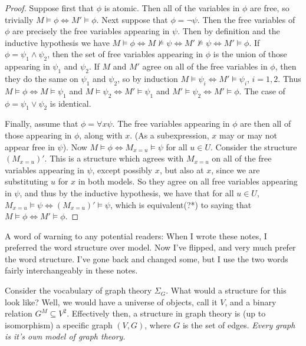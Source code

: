 \begin{proof}
    Suppose first that $\phi$ is atomic. Then all of the variables in $\phi$ are free, so trivially $M \models \phi \iff M' \models \phi$. Next suppose that $\phi = \neg \psi$. Then the free variables of $\phi$ are precisely the free variables appearing in $\psi$. Then by definition and the inductive hypothesis we have $M \models \phi \iff M \nvDash \psi \iff M' \nvDash \psi \iff M' \models \phi$. If $\phi = \psi_1 \wedge \psi_2$, then the set of free variables appearing in $\phi$ is the union of those appearing in $\psi_1$ and $\psi_2$. If $M$ and $M'$ agree on all of the free variables in $\phi$, then they do the same on $\psi_1$ and $\psi_2$, so by induction $M \models \psi_i \iff M' \models \psi_i$, $i=1,2$. Thus $M \models \phi \iff M \models \psi_1$ and $M \models \psi_2 \iff M' \models \psi_1$ and $M' \models \psi_2 \iff M' \models \phi$. The case of $\phi = \psi_1 \vee \psi_2$ is identical.
    \par Finally, assume that $\phi = \forall x \psi$. The free variables appearing in $\phi$ are then all of those appearing in $\phi$, along with $x$. (As a subexpression, $x$ may or may not appear free in $\psi$). Now $M \models \phi \iff M_{x=u} \models \psi$ for all $u \in U$. Consider the structure $(M_{x=u})'$. This is a structure which agrees with $M_{x=u}$ on all of the free variables appearing in $\psi$, except possibly $x$, but also at $x$, since we are substituting $u$ for $x$ in both models. So they agree on all free variables appearing in $\psi$, and thus by the inductive hypothesis, we have that for all $u \in U$, $M_{x=u} \models \psi \iff (M_{x=u})' \models \psi$, which is equivalent(?*) to saying that $M \models \phi \iff M' \models \phi$. 
\end{proof}
A word of warning to any potential readers: When I wrote these notes, I preferred the word structure over model. Now I've flipped, and very much prefer the word structure. I've gone back and changed some, but I use the two words fairly interchangeably in these notes.
\begin{example}
    Consider the vocabulary of graph theory $\Sigma_G$. What would a structure for this look like? Well, we would have a universe of objects, call it $V$, and a binary relation $G^M \subseteq V^2$. Effectively then, a structure in graph theory is (up to isomorphism) a specific graph $(V,G)$, where $G$ is the set of edges. \textit{Every graph is it's own model of graph theory}. 
\end{example}
